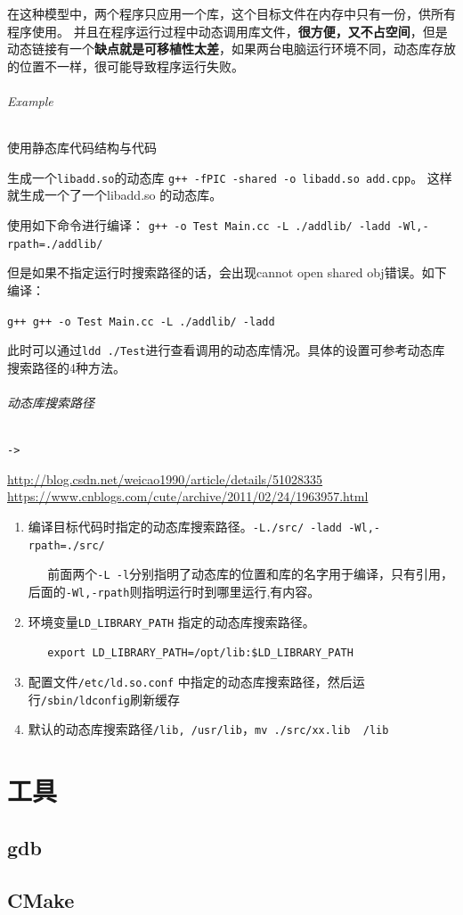 \documentclass[UTF8,a4paper,12pt]{ctexbook}
\begin{document}
		在这种模型中，两个程序只应用一个库，这个目标文件在内存中只有一份，供所有程序使用。
		并且在程序运行过程中动态调用库文件，\textbf{很方便，又不占空间}，但是动态链接有一个\textbf{缺点就是可移植性太差}，如果两台电脑运行环境不同，动态库存放的位置不一样，很可能导致程序运行失败。
			
		\subparagraph{Example}使用静态库代码结构与代码
		
		生成一个\verb|libadd.so|的动态库
		\verb|g++ -fPIC -shared -o libadd.so add.cpp|。
		这样就生成一个了一个libadd.so 的动态库。
		
		
		使用如下命令进行编译：
		\verb|g++ -o Test Main.cc -L ./addlib/ -ladd -Wl,-rpath=./addlib/|
		
		但是如果不指定运行时搜索路径的话，会出现cannot open shared obj错误。如下编译：
		
		\verb|g++ g++ -o Test Main.cc -L ./addlib/ -ladd|
		
		此时可以通过\verb|ldd ./Test|进行查看调用的动态库情况。具体的设置可参考动态库搜索路径的4种方法。
		
		
		\subparagraph{动态库搜索路径}\verb|->|
		
			\url{http://blog.csdn.net/weicao1990/article/details/51028335}			
			\url{https://www.cnblogs.com/cute/archive/2011/02/24/1963957.html}
			
			\begin{enumerate}[itemindent= 2em]
				\item 编译目标代码时指定的动态库搜索路径。\verb|-L./src/ -ladd -Wl,-rpath=./src/|
				
				\verb|   |前面两个\verb|-L -l|分别指明了动态库的位置和库的名字用于编译，只有引用， 后面的\verb|-Wl,-rpath|则指明运行时到哪里运行,有内容。
				
				\item 环境变量\verb|LD_LIBRARY_PATH| 指定的动态库搜索路径。
				
				\verb|   export LD_LIBRARY_PATH=/opt/lib:$LD_LIBRARY_PATH|
				\item 配置文件\verb|/etc/ld.so.conf| 中指定的动态库搜索路径，然后运行\verb|/sbin/ldconfig|刷新缓存
				\item 默认的动态库搜索路径\verb|/lib, /usr/lib|，\verb|mv ./src/xx.lib  /lib|
			\end{enumerate}

\chapter{工具}
	\section{gdb}
	
	
	\section{CMake}
	
				    
\end{document}

